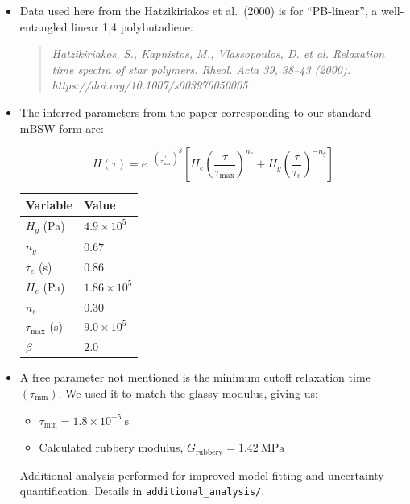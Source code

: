 \documentclass[a4paper, 12pt]{article}
\begin{document}
\begin{itemize}

\item Data used here from the Hatzikiriakos et al.~(2000) is for
``PB-linear'', a well-entangled linear 1,4 polybutadiene:
\begin{quote}
\textit{Hatzikiriakos, S., Kapnistos, M., Vlassopoulos, D. et al. Relaxation time spectra of star polymers. Rheol. Acta 39, 38–43 (2000). https://doi.org/10.1007/s003970050005}
\end{quote}
\item The inferred parameters from the paper corresponding to our standard
mBSW form are:

\[
H(\tau) = e^{-\left(\frac{\tau}{\tau_{\max}}\right)^\beta} 
\left[ H_e \left( \frac{\tau}{\tau_{\max}} \right)^{n_e} + 
H_g \left( \frac{\tau}{\tau_e} \right)^{-n_g} \right]
\]

\begin{table}[htbp]
    \centering
    \begin{tabular}{ll}
        \toprule
        \textbf{Variable} & \textbf{Value} \\
        \midrule
        \(H_g\) (Pa)  & \(4.9 \times 10^5\) \\
        \(n_g\)       & \(0.67\) \\
        \(\tau_e\) (s) & \(0.86\) \\
        \(H_e\) (Pa)  & \(1.86 \times 10^5\) \\
        \(n_e\)       & \(0.30\) \\
        \(\tau_{\max}\) (s) & \(9.0 \times 10^5\) \\
        \(\beta\)     & \(2.0\) \\
        \bottomrule
    \end{tabular}
    \label{tab:parameters}
\end{table}

\item A free parameter not mentioned is the minimum cutoff relaxation time
\((\tau_{\text{min}})\). We used it to match the glassy modulus,
giving us:

\begin{itemize}
  \item \(\tau_{\text{min}} = 1.8\times 10^{-5}~\text{s}\)
  \item Calculated rubbery modulus, \(G_{\text{rubbery}} = 1.42~\text{MPa}\)
\end{itemize}

Additional analysis performed for improved model fitting and
uncertainty quantification. Details in \texttt{additional\_analysis/}.


\end{itemize}
\end{document}
